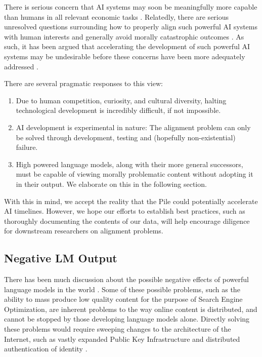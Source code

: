 \documentclass[11pt,a4paper]{article}
\begin{document}
There is serious concern that AI systems may soon be meaningfully more capable than humans in all relevant economic tasks \citep{grace_when_2018,IEM}. Relatedly, there are serious unresolved questions surrounding how to properly align such powerful AI systems with human interests \citep{bostrom2014ethics,russell2019human,bostrom2014superintelligence,amodei_concrete_2016} and generally avoid morally catastrophic outcomes \citep{sotala_superintelligence_2017,monster}. As such, it has been argued that accelerating the development of such powerful AI systems may be undesirable before these concerns have been more adequately addressed \citep{bostrom2014superintelligence}. 

There are several pragmatic responses to this view: 
\begin{enumerate}
\item Due to human competition, curiosity, and cultural diversity, halting technological development is incredibly difficult, if not impossible. \citep{russell2019human} \citep{critch2020ai}
\item AI development is experimental in nature: The alignment problem can only be solved through development, testing and (hopefully non-existential) failure.
\item High powered language models, along with their more general successors, must be capable of viewing morally problematic content without adopting it in their output. We elaborate on this in the following section.
\end{enumerate}

With this in mind, we accept the reality that the Pile could potentially accelerate AI timelines. However, we hope our efforts to establish best practices, such as thoroughly documenting the contents of our data, will help encourage diligence for downstream researchers on alignment problems.

\subsection{Negative LM Output}

There has been much discussion about the possible negative effects of powerful language models in the world \citep{GPT3,brundage_malicious_2018}. Some of these possible problems, such as the ability to mass produce low quality content for the purpose of Search Engine Optimization, are inherent problems to the way online content is distributed, and cannot be stopped by those developing language models alone. Directly solving these problems would require sweeping changes to the architecture of the Internet, such as vastly expanded Public Key Infrastructure and distributed authentication of identity \citep{practical_cryptography}. %
\end{document}
